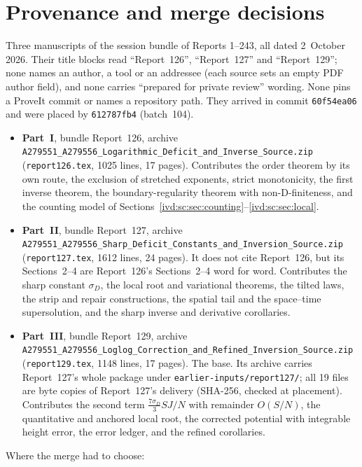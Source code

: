 \documentclass[11pt,letterpaper]{article}
\theoremstyle{remark}\newtheorem{remark}[theorem]{Remark}
\numberwithin{equation}{section}
\newcommand{\file}[1]{\nolinkurl{#1}}
\begin{document}
\section*{Provenance and merge decisions}\label{ivd:sec:provenance}
Three manuscripts of the session bundle of Reports 1--243, all dated 2~October 2026. Their title blocks read ``Report~126'', ``Report~127'' and ``Report~129''; none names an author, a tool or an addressee (each source sets an empty PDF author field), and none carries ``prepared for private review'' wording. None pins a ProveIt commit or names a repository path. They arrived in commit \texttt{60f54ea06} and were placed by \texttt{612787fb4} (batch~104).
\begin{itemize}
\item \textbf{Part~I}, bundle Report~126, archive \file{A279551_A279556_Logarithmic_Deficit_and_Inverse_Source.zip} (\file{report126.tex}, 1025 lines, 17 pages). Contributes the order theorem by its own route, the exclusion of stretched exponents, strict monotonicity, the first inverse theorem, the boundary-regularity theorem with non-D-finiteness, and the counting model of Sections~\ref{ivd:sc:sec:counting}--\ref{ivd:sc:sec:local}.
\item \textbf{Part~II}, bundle Report~127, archive \file{A279551_A279556_Sharp_Deficit_Constants_and_Inversion_Source.zip} (\file{report127.tex}, 1612 lines, 24 pages). It does not cite Report~126, but its Sections~2--4 are Report~126's Sections~2--4 word for word. Contributes the sharp constant $\sigma_D$, the local root and variational theorems, the tilted laws, the strip and repair constructions, the spatial tail and the space--time supersolution, and the sharp inverse and derivative corollaries.
\item \textbf{Part~III}, bundle Report~129, archive \file{A279551_A279556_Loglog_Correction_and_Refined_Inversion_Source.zip} (\file{report129.tex}, 1148 lines, 17 pages). The base. Its archive carries Report~127's whole package under \file{earlier-inputs/report127/}; all 19 files are byte copies of Report~127's delivery (SHA-256, checked at placement). Contributes the second term $\frac{7\sigma_D}3SJ/N$ with remainder $O(S/N)$, the quantitative and anchored local root, the corrected potential with integrable height error, the error ledger, and the refined corollaries.
\end{itemize}
Where the merge had to choose:
\end{document}
